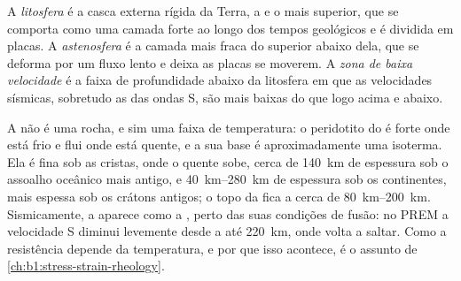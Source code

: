 \begin{definition}
\label{def:b1:layered-earth:lithosphere}
A \emph{litosfera} é a casca externa rígida da Terra, a  e o  mais superior, que se comporta como uma camada forte ao longo dos tempos geológicos e é dividida em placas. A \emph{astenosfera} é a camada mais fraca do  superior abaixo dela, que se deforma por um fluxo lento e deixa as placas se moverem. A \emph{zona de baixa velocidade} é a faixa de profundidade abaixo da litosfera em que as velocidades sísmicas, sobretudo as das ondas S, são mais baixas do que logo acima e abaixo.
\end{definition}

A  não é uma rocha, e sim uma faixa de temperatura: o peridotito do  é forte onde está frio e flui onde está quente, e a sua base é aproximadamente uma isoterma. Ela é fina sob as cristas, onde o  quente sobe, cerca de \qty{140}{km} de espessura sob o assoalho oceânico mais antigo, e \qtyrange{40}{280}{km} de espessura sob os continentes, mais espessa sob os crátons antigos; o topo da  fica a cerca de \qtyrange{80}{200}{km}. Sismicamente, a  aparece como a , perto das suas condições de fusão: no PREM a velocidade S diminui levemente desde a  até \qty{220}{km}, onde volta a saltar. Como a resistência depende da temperatura, e por que isso acontece, é o assunto de \cref{ch:b1:stress-strain-rheology}.

